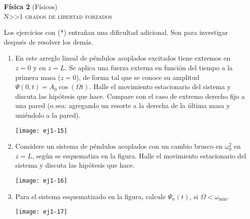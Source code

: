 \documentclass[11pt,spanish,a4paper]{article}
\begin{document}
\begin{center}
	\textbf{Física 2} (Físicos) \hfill {}\\
	\textsc{\LARGE N\textgreater\textgreater1 grados de libertad forzados}
\end{center}

Los ejercicios con (*) entrañan una dificultad adicional. Son para investigar después de resolver los demás.


\begin{enumerate}

				
\item
\begin{minipage}[t][3.5cm]{0.6\textwidth}
En este arreglo lineal de péndulos acoplados excitados tiene extremos en $z= 0$ y en $z= L$.
Se aplica una fuerza externa en función del tiempo a la primera masa ($z=0$), de forma tal que se conoce su amplitud $\Psi(0,t)= A_0 \cos(\Omega t)$.
Halle el movimiento estacionario del sistema y discuta las hipótesis que hace.
Compare con el caso de extremo derecho fijo a una pared (o sea: agregando un resorte a la derecha de la última masa y uniéndolo a la pared). 
\end{minipage}
\begin{minipage}[c][0cm][t]{0.35\textwidth}
  \texttt{[image: ej1-15]}
\end{minipage}



\item
\begin{minipage}[t][4cm]{0.35\textwidth}
Considere un sistema de péndulos acoplados con un cambio brusco en $\omega_{0}^{2}$ en $z=L$, según se esquematiza en la figura.
Halle el movimiento estacionario del sistema y discuta las hipótesis que hace.
\end{minipage}
\begin{minipage}[c][1cm][t]{0.6\textwidth}
  \texttt{[image: ej1-16]}
\end{minipage}



\item
\begin{minipage}[t][3.5cm]{0.45\textwidth}
Para el sistema esquematizado en la figura, calcule $\Psi_{n}(t)$, si $\Omega<\omega_\textrm{mín}$.
\end{minipage}
\begin{minipage}[c][2cm][t]{0.5\textwidth}
  \texttt{[image: ej1-17]}
\end{minipage}




\end{enumerate}
\end{document}
